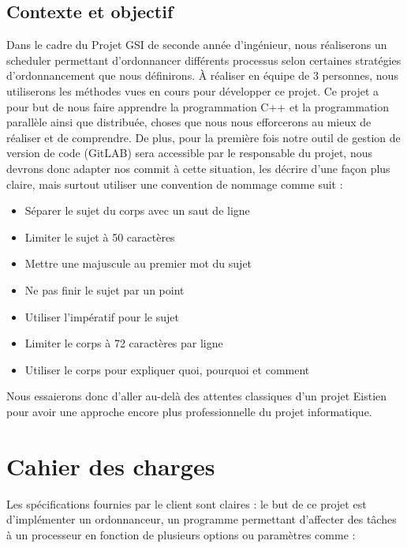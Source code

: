 \documentclass[a4paper,11pt,final]{report}
\begin{document}
    
    \section{Contexte et objectif}
        
    Dans le cadre du Projet GSI de seconde année d'ingénieur, nous réaliserons un scheduler permettant d'ordonnancer différents processus selon certaines stratégies d’ordonnancement que nous définirons. À réaliser en équipe de 3 personnes, nous utiliserons les méthodes vues en cours pour développer ce projet. Ce projet a pour but de nous faire apprendre la programmation C++ et la programmation parallèle ainsi que distribuée, choses que nous nous efforcerons au mieux de réaliser et de comprendre. De plus, pour la première fois notre outil de gestion de version de code (GitLAB) sera accessible par le responsable du projet, nous devrons donc adapter nos commit à cette situation, les décrire d'une façon plus claire, mais surtout utiliser une convention de nommage comme suit :
    
    \begin{itemize}
        \item Séparer le sujet du corps avec un saut de ligne
        \item Limiter le sujet à 50 caractères
        \item Mettre une majuscule au premier mot du sujet
        \item Ne pas finir le sujet par un point
        \item Utiliser l'impératif pour le sujet
        \item Limiter le corps à 72 caractères par ligne
        \item Utiliser le corps pour expliquer quoi, pourquoi et comment
    \end{itemize}
    
    Nous essaierons donc d'aller au-delà des attentes classiques d'un projet Eistien pour avoir une approche encore plus professionnelle du projet informatique.
    
\chapter{Cahier des charges}

    Les spécifications fournies par le client sont claires : le but de ce projet est d'implémenter un ordonnanceur, un programme permettant d'affecter des tâches à un processeur en fonction de plusieurs options ou paramètres comme : 
    
\end{document}
